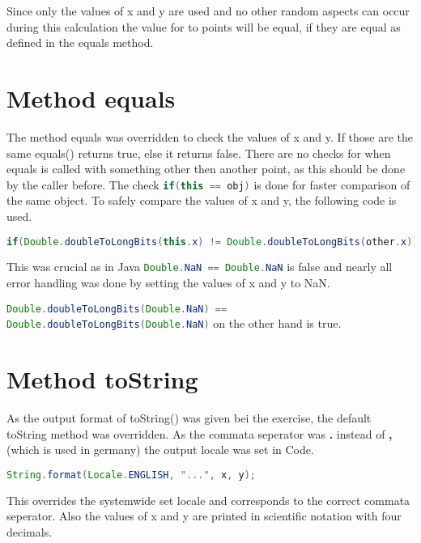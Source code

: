 Since only the values of x and y are used and no other random aspects can occur during this calculation the value for to points will be equal, if they are equal as defined in the equals method.

\section{Method equals}
The method equals was overridden to check the values of x and y. If those are the same equals() returns true, else it returns false. There are no checks for when equals is called with something other then another point, as this should be done by the caller before. The check \lstinline[language=java]{if(this == obj)} is done for faster comparison of the same object.
To safely compare the values of x and y, the following code is used.
\begin{lstlisting}[language=java, caption=Safely compare double values in java]
    if(Double.doubleToLongBits(this.x) != Double.doubleToLongBits(other.x)) {...}
\end{lstlisting}

This was crucial as in Java \lstinline[language=java, breaklines=true]{Double.NaN == Double.NaN} is false and nearly all error handling was done by setting the values of x and y to NaN.

\lstinline[language=java, breaklines=true]{Double.doubleToLongBits(Double.NaN) == Double.doubleToLongBits(Double.NaN)} on the other hand is true.

\section{Method toString}
As the output format of toString() was given bei the exercise, the default toString method was overridden. As the commata seperator was \textbf{.} instead of \textbf{,} (which is used in germany) the output locale was set in Code.
\begin{lstlisting}[language=java, caption=Setting locale to get correctly printed decimal seperator]
    String.format(Locale.ENGLISH, "...", x, y);
\end{lstlisting}
This overrides the systemwide set locale and corresponds to the correct commata seperator. Also the values of x and y are printed in scientific notation with four decimals.
